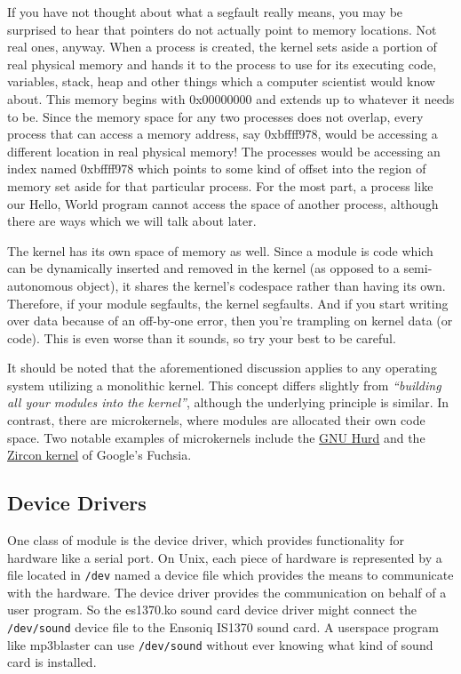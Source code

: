 \documentclass[10pt, oneside]{book}
\begin{document}
If you have not thought about what a segfault really means, you may be surprised to hear that pointers do not actually point to memory locations.
Not real ones, anyway.
When a process is created, the kernel sets aside a portion of real physical memory and hands it to the process to use for its executing code, variables, stack, heap and other things which a computer scientist would know about.
This memory begins with 0x00000000 and extends up to whatever it needs to be.
Since the memory space for any two processes does not overlap, every process that can access a memory address, say 0xbffff978, would be accessing a different location in real physical memory!
The processes would be accessing an index named 0xbffff978 which points to some kind of offset into the region of memory set aside for that particular process.
For the most part, a process like our Hello, World program cannot access the space of another process, although there are ways which we will talk about later.

The kernel has its own space of memory as well. Since a module is code which can be dynamically inserted and removed in the kernel (as opposed to a semi-autonomous object), it shares the kernel's codespace rather than having its own.
Therefore, if your module segfaults, the kernel segfaults.
And if you start writing over data because of an off-by-one error, then you're trampling on kernel data (or code).
This is even worse than it sounds, so try your best to be careful.

It should be noted that the aforementioned discussion applies to any operating system utilizing a monolithic kernel.
This concept differs slightly from \emph{``building all your modules into the kernel''},
although the underlying principle is similar.
In contrast, there are microkernels, where modules are allocated their own code space.
Two notable examples of microkernels include the \href{https://www.gnu.org/software/hurd/}{GNU Hurd} and the \href{https://fuchsia.dev/fuchsia-src/concepts/kernel}{Zircon kernel} of Google's Fuchsia.

\subsection{Device Drivers}
\label{sec:device_drivers}
One class of module is the device driver, which provides functionality for hardware like a serial port.
On Unix, each piece of hardware is represented by a file located in \verb|/dev| named a device file which provides the means to communicate with the hardware.
The device driver provides the communication on behalf of a user program.
So the es1370.ko sound card device driver might connect the \verb|/dev/sound| device file to the Ensoniq IS1370 sound card.
A userspace program like mp3blaster can use \verb|/dev/sound| without ever knowing what kind of sound card is installed.
\end{document}
